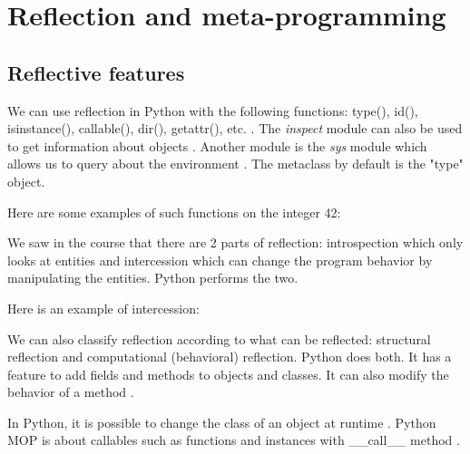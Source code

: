 \section{Reflection and meta-programming}
\subsection{Reflective features}
We can use reflection in Python with the following functions: type(), id(), isinstance(), callable(), dir(), getattr(), etc. \cite{python_doc_functions}.
The \textit{inspect} module can also be used to get information about objects \cite{python_doc_inspect}. Another module is the \textit{sys} module which allows us to query about the environment \cite{zetcode_introspection}.
The metaclass by default is the "type" object.

Here are some examples of such functions on the integer 42:


We saw in the course that there are 2 parts of reflection: introspection which only looks at entities and intercession which can change the program behavior by manipulating the entities. %
Python performs the two.
\newline

Here is an example of intercession:


%
%
%
%
%
%
%
%
%
%
%

We can also classify reflection according to what can be reflected: structural reflection and computational (behavioral) reflection. %
Python does both. It has a feature to add fields and methods to objects and classes. It can also modify the behavior of a method \cite{mendez2011computational}.

In Python, it is possible to change the class of an object at runtime \cite{dynamic_lang_study}. %
Python MOP is about callables such as functions and instances with \_\_call\_\_ method \cite{Russel_MOP}.

